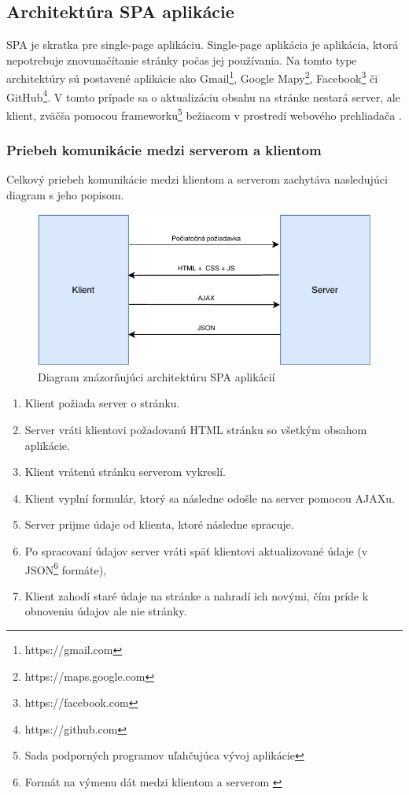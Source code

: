 \subsection{Architektúra SPA aplikácie}
SPA je skratka pre single-page aplikáciu. Single-page aplikácia je aplikácia, ktorá nepotrebuje znovunačítanie stránky počas jej používania. Na tomto type architektúry sú postavené aplikácie ako Gmail\footnote{https://gmail.com}, Google Mapy\footnote{https://maps.google.com}, Facebook\footnote{https://facebook.com} či GitHub\footnote{https://github.com}. V tomto prípade sa o aktualizáciu obsahu na stránke nestará server, ale klient, zväčša pomocou frameworku\footnote{Sada podporných programov uľahčujúca vývoj aplikácie} bežiacom v prostredí webového prehliadača \cite{spa-vs-mpa-3}.

\subsubsection*{Priebeh komunikácie medzi serverom a klientom}
Celkový priebeh komunikácie medzi klientom a serverom zachytáva nasledujúci diagram s jeho popisom.

\begin{figure}[H]
	\includegraphics[width=1.0\textwidth]{media/navrh/SPA.pdf}
	\caption{Diagram znázorňujúci architektúru SPA aplikácií}\label{spa-graf}
\end{figure}

\begin{enumerate}
	\item Klient požiada server o stránku.
	\item Server vráti klientovi požadovanú HTML stránku so všetkým obsahom aplikácie.
	\item Klient vrátenú stránku serverom vykreslí.
	\item Klient vyplní formulár, ktorý sa následne odošle na server pomocou AJAXu.
	\item Server prijme údaje od klienta, ktoré následne spracuje.
	\item Po spracovaní údajov server vráti späť klientovi aktualizované údaje (v JSON\footnote{Formát na výmenu dát medzi klientom a serverom \cite{co-je-json} } formáte),
	\item Klient zahodí staré údaje na stránke a nahradí ich novými, čím príde k obnoveniu údajov ale nie stránky.
\end{enumerate}


